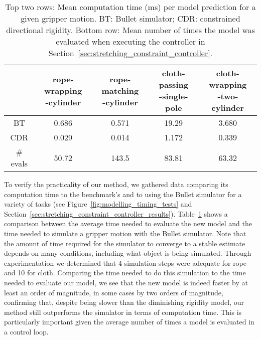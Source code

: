 \begin{table}[ht]
\centering
\caption{Top two rows: Mean computation time (ms) per model prediction for a given gripper motion. BT: Bullet simulator; CDR: constrained directional rigidity. Bottom row: Mean number of times the model was evaluated when executing the controller in Section~\ref{sec:stretching_constraint_controller}.}
\label{tbl:simulation_time_report}
\begin{tabular}{ccccc}
\hline
            & \makecell{rope-wrapping\\-cylinder} 
            & \makecell{rope-matching\\-cylinder}
            & \makecell{cloth-passing\\-single-pole}
            & \makecell{cloth-wrapping\\-two-cylinder} \\
\hline
BT          & 0.686 & 0.571 & 19.29 & 3.680 \\
CDR         & 0.029 & 0.014 & 1.172 & 0.339 \\
\hline
\# evals    & 50.72 & 143.5 & 83.81 & 63.32 \\
\hline
\end{tabular}
\end{table}

To verify the practicality of our method, we gathered data comparing its computation time to the benchmark's and to using the Bullet simulator for a variety of tasks (see Figure~\ref{fig:modelling_timing_tests} and Section~\ref{sec:stretching_constraint_controller_results}). Table~\ref{tbl:simulation_time_report} shows a comparison between the average time needed to evaluate the new model and the time needed to simulate a gripper motion with the Bullet simulator. Note that the amount of time required for the simulator to converge to a stable estimate depends on many conditions, including what object is being simulated. Through experimentation we determined that 4 simulation steps were adequate for rope and 10 for cloth. Comparing the time needed to do this simulation to the time needed to evaluate our model, we see that the new model is indeed faster by at least an order of magnitude, in some cases by two orders of magnitude, confirming that, despite being slower than the diminishing rigidity model, our method still outperforms the simulator in terms of computation time. This is particularly important given the average number of times a model is evaluated in a control loop.
